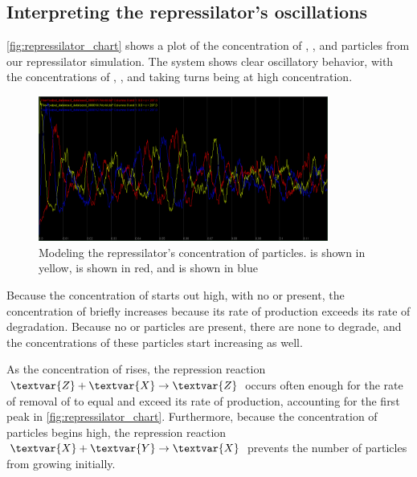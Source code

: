 
\FloatBarrier
{}
\subsection{Interpreting the repressilator's oscillations}

\autoref{fig:repressilator_chart} shows a plot of the concentration of , , and  particles from our repressilator simulation. The system shows clear oscillatory behavior, with the concentrations of , , and  taking turns being at high concentration.\\

\begin{qbox}\end{qbox}

\begin{figure}[h]
\centering
\mySfFamily
\includegraphics[width = 0.85\textwidth]{../images/repressilator_chart.png}
\caption{Modeling the repressilator's concentration of particles.  is shown in yellow,  is shown in red, and  is shown in blue}
\label{fig:repressilator_chart}
\end{figure}

Because the concentration of  starts out high, with no  or  present, the concentration of  briefly increases because its rate of production exceeds its rate of degradation. Because no  or  particles are present, there are none to degrade, and the concentrations of these particles start increasing as well.

As the concentration of  rises, the repression reaction $\textvar{Z} + \textvar{X} \rightarrow \textvar{Z}$ occurs often enough for the rate of removal of  to equal and exceed its rate of production, accounting for the first peak in \autoref{fig:repressilator_chart}. Furthermore, because the concentration of  particles begins high, the repression reaction $\textvar{X} + \textvar{Y} \rightarrow \textvar{X}$ prevents the number of  particles from growing initially.

